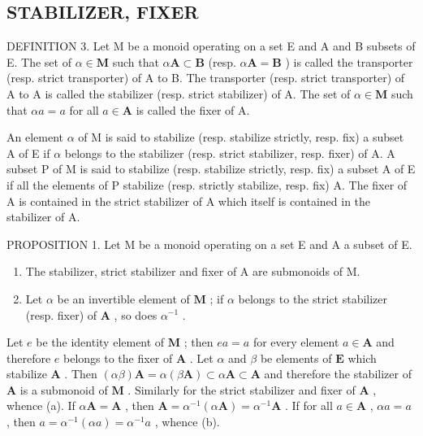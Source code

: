 \subsection{STABILIZER, FIXER}

DEFINITION 3. Let M be a monoid operating on a set E and A and B subsets of E. The set of \(\alpha \in \mathbf{M}\) such that \(\alpha \mathbf{A} \subset \mathbf{B}\) (resp. \(\alpha \mathbf{A} = \mathbf{B}\) ) is called the transporter (resp. strict transporter) of A to B. The transporter (resp. strict transporter) of A to A is called the stabilizer (resp. strict stabilizer) of A. The set of \(\alpha \in \mathbf{M}\) such that \(\alpha a = a\) for all \(a \in \mathbf{A}\) is called the fixer of A.

An element \(\alpha\) of M is said to stabilize (resp. stabilize strictly, resp. fix) a subset A of E if \(\alpha\) belongs to the stabilizer (resp. strict stabilizer, resp. fixer) of A. A subset P of M is said to stabilize (resp. stabilize strictly, resp. fix) a subset A of E if all the elements of P stabilize (resp. strictly stabilize, resp. fix) A. The fixer of A is contained in the strict stabilizer of A which itself is contained in the stabilizer of A.

PROPOSITION 1. Let M be a monoid operating on a set E and A a subset of E.

\begin{enumerate}
\def\labelenumi{(\alph{enumi})}
\item
  The stabilizer, strict stabilizer and fixer of A are submonoids of M.
\item
  Let \(\alpha\) be an invertible element of \(\mathbf{M}\) ; if \(\alpha\) belongs to the strict stabilizer (resp. fixer) of \(\mathbf{A}\) , so does \(\alpha^{-1}\) .
\end{enumerate}

Let \(e\) be the identity element of \(\mathbf{M}\) ; then \(ea = a\) for every element \(a \in \mathbf{A}\) and therefore \(e\) belongs to the fixer of \(\mathbf{A}\) . Let \(\alpha\) and \(\beta\) be elements of \(\mathbf{E}\) which stabilize \(\mathbf{A}\) . Then \((\alpha\beta)\mathbf{A} = \alpha(\beta\mathbf{A}) \subset \alpha\mathbf{A} \subset \mathbf{A}\) and therefore the stabilizer of \(\mathbf{A}\) is a submonoid of \(\mathbf{M}\) . Similarly for the strict stabilizer and fixer of \(\mathbf{A}\) , whence (a). If \(\alpha\mathbf{A} = \mathbf{A}\) , then \(\mathbf{A} = \alpha^{-1}(\alpha\mathbf{A}) = \alpha^{-1}\mathbf{A}\) . If for all \(a \in \mathbf{A}\) , \(\alpha a = a\) , then \(a = \alpha^{-1}(\alpha a) = \alpha^{-1}a\) , whence (b).

